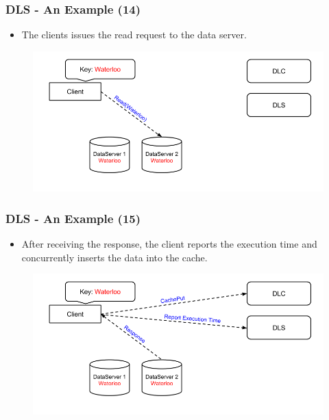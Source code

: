\documentclass{beamer}
\begin{document}
\begin{frame}
  \frametitle{DLS - An Example (14)}
  \begin{itemize}
  \item The clients issues the read request to the data server.
\newline
  \end{itemize}
  \begin{figure}
    \begin{center}
      \centerline{\includegraphics[scale=0.40]{img/DLS_Example08.png}}
    \end{center}
  \end{figure}
\end{frame}

\begin{frame}
  \frametitle{DLS - An Example (15)}
  \begin{itemize}
  \item After receiving the response, the client reports
    the execution time and concurrently inserts the data into the cache.
  \end{itemize}
  \vspace{-0.9 mm}
  \begin{figure}
    \begin{center}
      \centerline{\includegraphics[scale=0.40]{img/DLS_Example09.png}}
    \end{center}
  \end{figure}
\end{frame}
\end{document}
